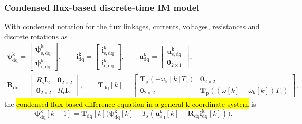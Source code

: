 \begin{frame}
    \frametitle{Condensed flux-based discrete-time IM model}
    With condensed notation for the flux linkages, currents, voltages, resistances and discrete rotations as
    \begin{equation}
        \begin{gathered}
            \bm{\psi}^{\mathrm{k}}_\mathrm{dq}=\begin{bmatrix}
                \bm{\psi}^{\mathrm{k}}_{\mathrm{s,dq}} \\
                \bm{\psi}^{\mathrm{k}}_{\mathrm{r,dq}}
            \end{bmatrix},\qquad
            \bm{i}^{\mathrm{k}}_\mathrm{dq}=\begin{bmatrix}
                \bm{i}^{\mathrm{k}}_{\mathrm{s,dq}} \\
                \bm{i}^{\mathrm{k}}_{\mathrm{r,dq}}
            \end{bmatrix},\qquad
            \bm{u}^{\mathrm{k}}_\mathrm{dq}=\begin{bmatrix}
                \bm{u}^{\mathrm{k}}_{\mathrm{s,dq}} \\
                \bm{0}_{2\times 1}
            \end{bmatrix},\\[1ex]
            \bm{R}_\mathrm{dq}=\begin{bmatrix}
                R_\mathrm{s}\bm{I}_2 & \bm{0}_{2\times 2}   \\
                \bm{0}_{2\times 2}   & R_\mathrm{r}\bm{I}_2
            \end{bmatrix},\qquad
            \bm{T}_\mathrm{dq}[k]=\begin{bmatrix}
                \bm{T}_\mathrm{p}(-\omega_\mathrm{k}[k]T_\mathrm{s}) & \bm{0}_{2\times 2}                                              \\
                \bm{0}_{2\times 2}                                   & \bm{T}_\mathrm{p}((\omega[k]-\omega_\mathrm{k}[k])T_\mathrm{s})
            \end{bmatrix},
        \end{gathered}
        \label{eq:IM_dt_condensed_notation}
    \end{equation}\pause%
    the \hl{condensed flux-based difference equation in a general $\mathrm{k}$ coordinate system} is
    \begin{equation}
        \bm{\psi}^{\mathrm{k}}_\mathrm{dq}[k+1]
        =\bm{T}_\mathrm{dq}[k]\Big(\bm{\psi}^{\mathrm{k}}_\mathrm{dq}[k]
        +T_\mathrm{s}(\bm{u}^{\mathrm{k}}_\mathrm{dq}[k]-\bm{R}_\mathrm{dq}\bm{i}^{\mathrm{k}}_\mathrm{dq}[k])\Big).
        \label{eq:IM_dt_flux_based_condensed}
    \end{equation}
\end{frame}

